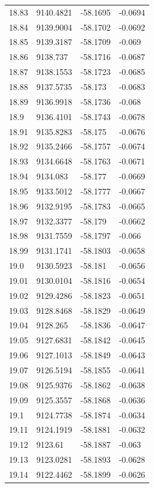 \begin{table}[H]
\begin{tabular}{llll}
18.83 & 9140.4821 & -58.1695 & -0.0694 \\
18.84 & 9139.9004 & -58.1702 & -0.0692 \\
18.85 & 9139.3187 & -58.1709 & -0.069 \\
18.86 & 9138.737 & -58.1716 & -0.0687 \\
18.87 & 9138.1553 & -58.1723 & -0.0685 \\
18.88 & 9137.5735 & -58.173 & -0.0683 \\
18.89 & 9136.9918 & -58.1736 & -0.068 \\
18.9 & 9136.4101 & -58.1743 & -0.0678 \\
18.91 & 9135.8283 & -58.175 & -0.0676 \\
18.92 & 9135.2466 & -58.1757 & -0.0674 \\
18.93 & 9134.6648 & -58.1763 & -0.0671 \\
18.94 & 9134.083 & -58.177 & -0.0669 \\
18.95 & 9133.5012 & -58.1777 & -0.0667 \\
18.96 & 9132.9195 & -58.1783 & -0.0665 \\
18.97 & 9132.3377 & -58.179 & -0.0662 \\
18.98 & 9131.7559 & -58.1797 & -0.066 \\
18.99 & 9131.1741 & -58.1803 & -0.0658 \\
19.0 & 9130.5923 & -58.181 & -0.0656 \\
19.01 & 9130.0104 & -58.1816 & -0.0654 \\
19.02 & 9129.4286 & -58.1823 & -0.0651 \\
19.03 & 9128.8468 & -58.1829 & -0.0649 \\
19.04 & 9128.265 & -58.1836 & -0.0647 \\
19.05 & 9127.6831 & -58.1842 & -0.0645 \\
19.06 & 9127.1013 & -58.1849 & -0.0643 \\
19.07 & 9126.5194 & -58.1855 & -0.0641 \\
19.08 & 9125.9376 & -58.1862 & -0.0638 \\
19.09 & 9125.3557 & -58.1868 & -0.0636 \\
19.1 & 9124.7738 & -58.1874 & -0.0634 \\
19.11 & 9124.1919 & -58.1881 & -0.0632 \\
19.12 & 9123.61 & -58.1887 & -0.063 \\
19.13 & 9123.0281 & -58.1893 & -0.0628 \\
19.14 & 9122.4462 & -58.1899 & -0.0626 \\

\end{tabular}
\end{table}
